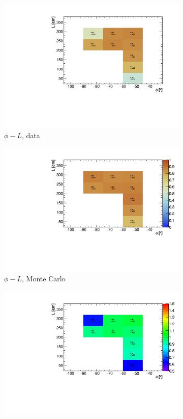 \documentclass[a4paper]{scrartcl}
\begin{document}
\begin{figure}[htbp]
\begin{center}
\begin{subfigure}{0.52\textwidth}
\includegraphics[width=\linewidth]{phi_l_data.pdf}
\caption{$\phi - L$, data} \label{fig:2d_cry_3}
\end{subfigure}\begin{subfigure}{0.52\textwidth}
\includegraphics[width=\linewidth]{phi_l_mc.pdf}
\caption{$\phi - L$, Monte Carlo}\label{fig:2d_cry_mc_3}
\end{subfigure}
\begin{subfigure}{0.52\textwidth}
\includegraphics[width=\linewidth]{ratio_phi_l.pdf}

\end{subfigure}
\end{center}
\end{figure}
\end{document}

